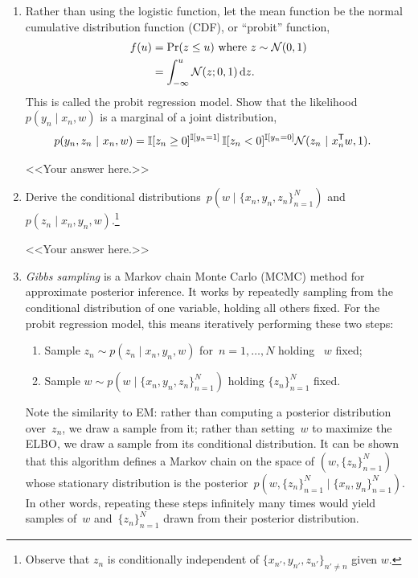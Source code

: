 \documentclass[11pt]{article}
\begin{document}
\begin{enumerate}[label=(\alph*)]
    \item Rather than using the logistic function, let the mean function be the normal cumulative distribution function (CDF), or ``probit'' function,
    \begin{align*}
        f(u) &= \Pr(z \leq u) \text{ where } z \sim \mathcal{N}(0, 1) \\
        &= \int_{-\infty}^u \mathcal{N}(z; 0, 1) \, \mathrm{d}z.
    \end{align*}
    This is called the probit regression model.  Show that the likelihood~$p(y_n \mid x_n, w)$ is a marginal of a joint distribution,
    \begin{align*}
        p(y_n, z_n ~\vert~ x_n, w) &= \mathbb{I}[z_n \geq 0]^{\mathbb{I}[y_n = 1]} \, \mathbb{I}[z_n < 0]^{\mathbb{I}[y_n = 0]} \mathcal{N}(z_n ~\vert~ x_n^{\mathsf{T}} w, 1).
    \end{align*}
    
    \begin{solution}
    <<Your answer here.>>
    \end{solution}
    
    \item Derive the conditional distributions~$p(w \mid \{x_n, y_n, z_n\}_{n=1}^N)$ and~$p(z_n \mid x_n, y_n, w)$.\footnote{Observe that $z_n$ is conditionally independent of $\{x_{n'}, y_{n'}, z_{n'}\}_{n' \neq n}$ given $w$.}
    
    \begin{solution}
    <<Your answer here.>>
    \end{solution}
    
    \item \emph{Gibbs sampling} is a Markov chain Monte Carlo (MCMC) method for approximate posterior inference.  It works by repeatedly sampling from the conditional distribution of one variable, holding all others fixed.  For the probit regression model, this means iteratively performing these two steps:
    \begin{enumerate}[label=\arabic*.]
        \item Sample $z_n \sim p(z_n \mid x_n, y_n, w)$ for~$n = 1, \ldots, N$ holding ~$w$ fixed;
        \item Sample $w \sim p(w \mid \{x_n, y_n, z_n\}_{n=1}^N)$ holding $\{z_n\}_{n=1}^N$ fixed.
    \end{enumerate}
    Note the similarity to EM: rather than computing a posterior distribution over~$z_n$, we draw a sample from it; rather than setting~$w$ to maximize the ELBO, we draw a sample from its conditional distribution.  It can be shown that this algorithm defines a Markov chain on the space of $(w, \{z_n\}_{n=1}^N)$ whose stationary distribution is the posterior~$p(w, \{z_n\}_{n=1}^N \mid \{x_n, y_n\}_{n=1}^N)$.  In other words, repeating these steps infinitely many times would yield samples of~$w$ and~$\{z_n\}_{n=1}^N$ drawn from their posterior distribution. 
    

\end{enumerate}
\end{document}
